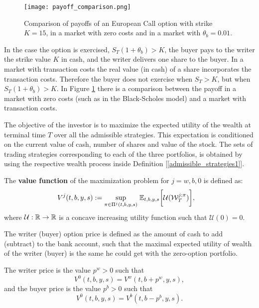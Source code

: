 \begin{figure}[t!]
 \centering
 \texttt{[image: payoff\_comparison.png]}
 \caption{Comparison of payoffs of an European Call option with strike $K=15$, in a market with zero costs and in a market with $\theta_b=0.01$.}
 \label{fig:payoff_comparison}
\end{figure}
In the case the option is exercised, $S_T(1+ \theta_b ) > K$, the buyer pays to the writer the strike value $K$ in cash, 
and the writer delivers one share to the buyer.
In a market with transaction costs the real value (in cash) of a share incorporates the transaction costs. 
Therefore the buyer does not exercise when $S_T > K$, but when $S_T(1+ \theta_b ) > K$. 
In Figure \ref{fig:payoff_comparison} there is a comparison between the payoff in a market with zero costs (such as in the Black-Scholes model) and a market with 
transaction costs.

The objective of the investor is to maximize the expected utility of the wealth at terminal time $T$ over all the admissible
strategies. This expectation is conditioned on the current value of cash, number of shares and value of the
stock.
The sets of trading strategies corresponding to each of the three portfolios, is obtained by using the respective wealth process inside Definition [\ref{admissible_strategies1}]. 

\begin{Definition}
 The \textbf{value function} of the maximization problem for $j=w,b,0$ is defined as:
\begin{align}\label{max_probl0}
V^j(t,b,y,s) := \sup_{\pi \in \Pi^j(t,b,y,s)} \; & \mathbb{E}_{t,b,y,s}\biggl[ 
            \mathcal{U}(\mathcal{W}^{j; \pi}_T) \biggr],             
\end{align}
where $\mathcal{U}: \mathbb{R} \to \mathbb{R}$ is a concave increasing utility function such that $\mathcal{U}(0)=0$.
\end{Definition}

The writer (buyer) option price is defined as the amount of cash to add (subtract) to the bank account, 
such that the maximal expected utility of wealth of the writer (buyer) is the same he could get with 
the zero-option portfolio.
\begin{Definition}
The writer price is the value $p^w>0$ such that 
 \begin{equation}\label{writer}
  V^0(t,b,y,s) = V^w(t,b+p^w,y,s),
 \end{equation}
 and the buyer price is the value $p^b>0$ such that
 \begin{equation}\label{buyer}
  V^0(t,b,y,s) = V^b(t,b-p^b,y,s).
 \end{equation}
\end{Definition}


